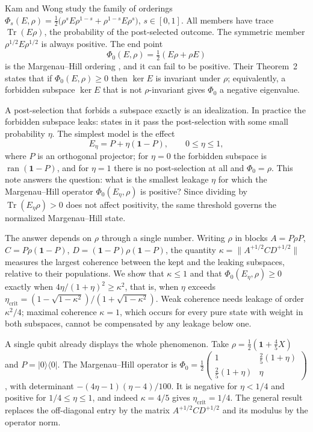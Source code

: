 \documentclass[11pt,a4paper]{article}
\theoremstyle{definition}
\theoremstyle{plain}
\DeclareMathOperator{\Tr}{Tr}
\DeclareMathOperator{\ran}{ran}
\newcommand{\ket}[1]{\lvert#1\rangle}
\newcommand{\bra}[1]{\langle#1\rvert}
\newcommand{\norm}[1]{\lVert#1\rVert}
\newcommand{\one}{\mathbf{1}}
\newcommand{\etac}{\eta_{\mathrm{crit}}}
\begin{document}
Kam and Wong \cite{KamWong2026} study the family of orderings
$\Phi_s(E,\rho)=\tfrac12\bigl(\rho^sE\rho^{1-s}+\rho^{1-s}E\rho^s\bigr)$,
$s\in[0,1]$. All members have trace $\Tr(E\rho)$, the probability of the
post-selected outcome. The symmetric member $\rho^{1/2}E\rho^{1/2}$ is always
positive. The end point
\[
\Phi_0(E,\rho)=\tfrac12(E\rho+\rho E)
\]
is the Margenau--Hill ordering \cite{KamWong2026}, and it can fail to be
positive. Their Theorem~2 states that if $\Phi_0(E,\rho)\ge0$ then $\ker E$ is
invariant under $\rho$; equivalently, a forbidden subspace $\ker E$ that is
not $\rho$-invariant gives $\Phi_0$ a negative eigenvalue.

A post-selection that forbids a subspace exactly is an idealization. In
practice the forbidden subspace leaks: states in it pass the post-selection
with some small probability $\eta$. The simplest model is the effect
\[
E_\eta=P+\eta(\one-P),\qquad 0\le\eta\le1,
\]
where $P$ is an orthogonal projector; for $\eta=0$ the forbidden subspace is
$\ran(\one-P)$, and for $\eta=1$ there is no post-selection at all and
$\Phi_0=\rho$. This note answers the question: what is the smallest leakage
$\eta$ for which the Margenau--Hill operator $\Phi_0(E_\eta,\rho)$ is positive?
Since dividing by $\Tr(E_\eta\rho)>0$ does not affect positivity, the same
threshold governs the normalized Margenau--Hill state.

The answer depends on $\rho$ through a single number. Writing $\rho$ in blocks
$A=P\rho P$, $C=P\rho(\one-P)$, $D=(\one-P)\rho(\one-P)$, the quantity
$\kappa=\norm{A^{+1/2}CD^{+1/2}}$ measures the largest coherence between the
kept and the leaking subspaces, relative to their populations. We show that
$\kappa\le1$ and that $\Phi_0(E_\eta,\rho)\ge0$ exactly when
$4\eta/(1+\eta)^2\ge\kappa^2$, that is, when $\eta$ exceeds
$\etac=(1-\sqrt{1-\kappa^2})/(1+\sqrt{1-\kappa^2})$. Weak coherence needs
leakage of order $\kappa^2/4$; maximal coherence $\kappa=1$, which occurs for
every pure state with weight in both subspaces, cannot be compensated by any
leakage below one.

A single qubit already displays the whole phenomenon. Take
$\rho=\tfrac12(\one+\tfrac45X)$ and $P=\ket0\bra0$. The Margenau--Hill
operator is
$\Phi_0=\tfrac12\left(\begin{smallmatrix}1&\frac{2}{5}(1+\eta)\\[0.2em]
\frac25(1+\eta)&\eta\end{smallmatrix}\right)$, with determinant
$-(4\eta-1)(\eta-4)/100$. It is negative for $\eta<1/4$ and positive for
$1/4\le\eta\le1$, and indeed $\kappa=4/5$ gives $\etac=1/4$. The general
result replaces the off-diagonal entry by the matrix $A^{+1/2}CD^{+1/2}$ and its
modulus by the operator norm.
\end{document}
